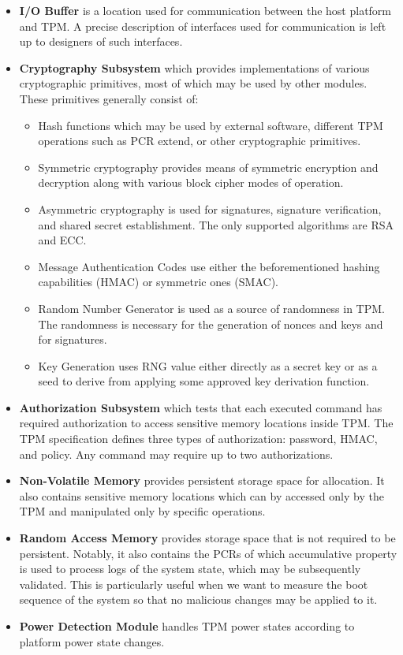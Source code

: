 \begin{itemize}

\item \textbf{I/O Buffer} is a location used for communication between the host platform and TPM. A precise description of interfaces used for communication is left up to designers of such interfaces.

\item \textbf{Cryptography Subsystem} which provides implementations of various cryptographic primitives, most of which may be used by other modules. These primitives generally consist of: 
\begin{itemize}
    \item Hash functions which may be used by external software, different TPM operations such as PCR extend, or other cryptographic primitives. 
    \item Symmetric cryptography provides means of symmetric encryption and decryption along with various block cipher modes of operation.
    \item Asymmetric cryptography is used for signatures, signature verification, and shared secret establishment. The only supported algorithms are RSA and ECC.
    \item Message Authentication Codes use either the beforementioned hashing capabilities (HMAC) or symmetric ones (SMAC).
    \item Random Number Generator is used as a source of randomness in TPM. The randomness is necessary for the generation of nonces and keys and for signatures. 
    \item Key Generation uses RNG value either directly as a secret key or as a seed to derive from applying some approved key derivation function.
\end{itemize}

\item \textbf{Authorization Subsystem} which tests that each executed command has required authorization to access sensitive memory locations inside TPM. The TPM specification \cite{tcg_p1_architecture} defines three types of authorization: password, HMAC, and policy. Any command may require up to two authorizations.

\item \textbf{Non-Volatile Memory} provides persistent storage space for allocation. It also contains sensitive memory locations which can by accessed only by the TPM and manipulated only by specific operations.

\item \textbf{Random Access Memory} provides storage space that is not required to be persistent. Notably, it also contains the PCRs of which accumulative property is used to process logs of the system state, which may be subsequently validated. This is particularly useful when we want to measure the boot sequence of the system so that no malicious changes may be applied to it.

\item \textbf{Power Detection Module} handles TPM power states according to platform power state changes.
\end{itemize}


